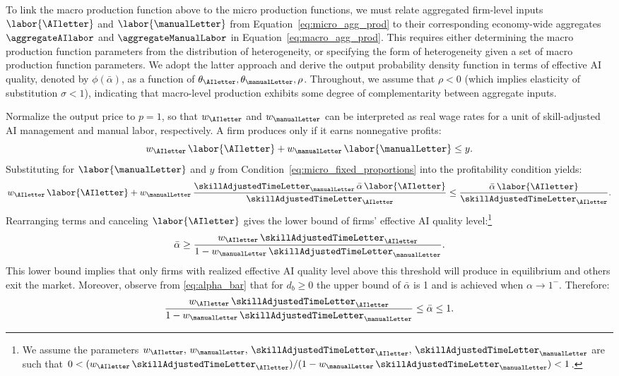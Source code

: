 To link the macro production function above to the micro production functions, we must relate aggregated firm-level inputs \( \labor{\AIletter}\) and \( \labor{\manualLetter} \) from Equation~\eqref{eq:micro_agg_prod} to their corresponding economy-wide aggregates \( \aggregateAIlabor\) and \( \aggregateManualLabor \) in Equation~\eqref{eq:macro_agg_prod}.
This requires either determining the macro production function parameters from the distribution of heterogeneity, or specifying the form of heterogeneity given a set of macro production function parameters.
We adopt the latter approach and derive the output probability density function in terms of effective AI quality, denoted by \( \phi(\bar{\alpha}) \), as a function of \( \theta_{\AIletter}, \theta_{\manualLetter}, \rho \).
Throughout, we assume that $\rho<0$ (which implies elasticity of substitution $\sigma<1$), indicating that macro-level production exhibits some degree of complementarity between aggregate inputs.

Normalize the output price to $p=1$, so that $w_{\AIletter}$ and $w_{\manualLetter}$ can be interpreted as real wage rates for a unit of skill-adjusted AI management and manual labor, respectively.
A firm produces only if it earns nonnegative profits:
\[
w_{\AIletter}\,\labor{\AIletter}+w_{\manualLetter}\,\labor{\manualLetter}\leq y.
\]
Substituting for $\labor{\manualLetter}$ and $y$ from Condition~\eqref{eq:micro_fixed_proportions} into the profitability condition yields:
\[
w_{\AIletter}\,\labor{\AIletter}+w_{\manualLetter}\,\frac{\skillAdjustedTimeLetter_{\manualLetter}\,\bar{\alpha}\,\labor{\AIletter}}{\skillAdjustedTimeLetter_{\AIletter}} \leq \frac{\bar{\alpha}\,\labor{\AIletter}}{\skillAdjustedTimeLetter_{\AIletter}}.
\]
Rearranging terms and canceling $\labor{\AIletter}$ gives the lower bound of firms' effective AI quality level:\footnote{We assume the parameters $w_{\AIletter},\,w_{\manualLetter},\,\skillAdjustedTimeLetter_{\AIletter},\,\skillAdjustedTimeLetter_{\manualLetter}$ are such that $0 < ({w_{\AIletter}\,\skillAdjustedTimeLetter_{\AIletter}})/(1-w_{\manualLetter}\,\skillAdjustedTimeLetter_{\manualLetter}) < 1$.}
\[
\bar{\alpha} \geq \frac{w_{\AIletter}\,\skillAdjustedTimeLetter_{\AIletter}}{1 - w_{\manualLetter}\,\skillAdjustedTimeLetter_{\manualLetter}}.
\]
This lower bound implies that only firms with realized effective AI quality level above this threshold will produce in equilibrium and others exit the market.
Moreover, observe from \eqref{eq:alpha_bar} that for $d_b \geq 0$ the upper bound of $\bar{\alpha}$ is 1 and is achieved when $\alpha \rightarrow 1^{-}$.
Therefore:
\begin{equation}
\frac{w_{\AIletter}\,\skillAdjustedTimeLetter_{\AIletter}}{1 - w_{\manualLetter}\,\skillAdjustedTimeLetter_{\manualLetter}} \leq \bar{\alpha} \leq 1.
\label{eq:alpha_threshold}
\end{equation}

